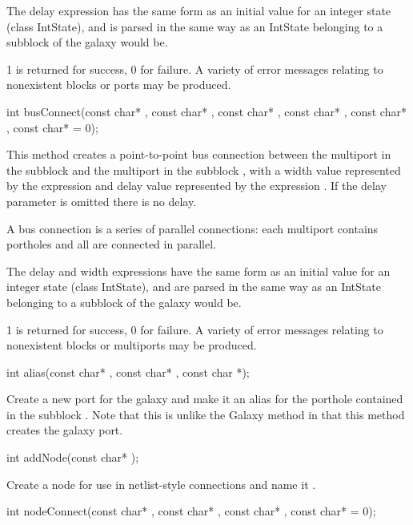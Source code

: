 The delay expression has the same form as an initial value for an
integer state (class IntState), and is parsed in the same way as
an IntState belonging to a subblock of the galaxy would be.

1 is returned for success, 0 for failure.
A variety of error messages relating to nonexistent blocks or ports
may be produced.

\begin{example}
int busConnect(const char* , const char* ,
               const char* , const char* ,
               const char* , const char*  = 0);
\end{example}

This method creates a point-to-point bus connection between the multiport
 in the subblock  and the multiport 
in the subblock , with a width value represented by the
expression  and delay value represented by
the expression .  If the delay parameter is omitted there is
no delay.

A bus connection is a series of parallel connections: each multiport
contains  portholes and all are connected in parallel.

The delay and width expressions have the same form as an initial value for an
integer state (class IntState), and are parsed in the same way as
an IntState belonging to a subblock of the galaxy would be.

1 is returned for success, 0 for failure.
A variety of error messages relating to nonexistent blocks or multiports
may be produced.

\begin{example}
int alias(const char* , const char* , const char *);
\end{example}

Create a new port for the galaxy and make it an alias for the porthole
 contained in the subblock .  Note that this
is unlike the Galaxy  method in that this method creates
the galaxy port.

\begin{example}
int addNode(const char* );
\end{example}

Create a node for use in netlist-style connections and name it
.

\begin{example}
int nodeConnect(const char* , const char* ,
                const char* , const char*  = 0);
\end{example}

